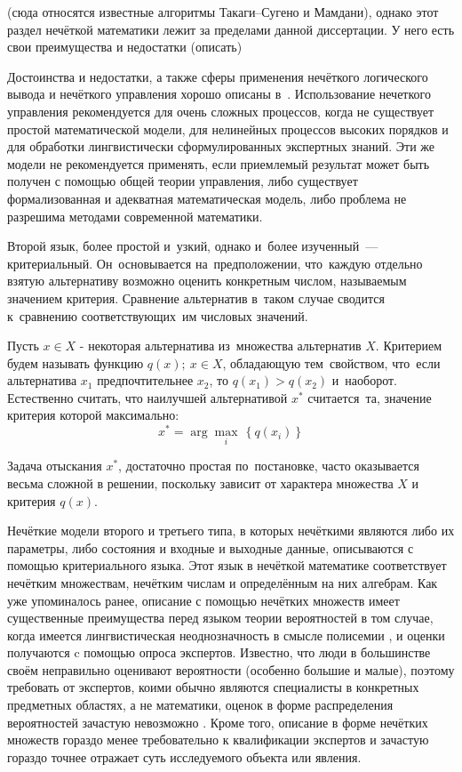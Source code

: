  (сюда относятся известные алгоритмы Такаги--Сугено и Мамдани), однако этот раздел нечёткой математики лежит за пределами данной диссертации. У него есть свои преимущества и недостатки (описать)
 
Достоинства и недостатки, а также сферы применения нечёткого логического вывода и нечёткого управления хорошо описаны в~\cite{Bauer_Winkler}.
Использование нечеткого управления рекомендуется для очень сложных процессов, когда не существует простой математической модели, для нелинейных процессов высоких порядков и для обработки лингвистически сформулированных экспертных знаний. Эти же модели не рекомендуется применять, если приемлемый результат может быть получен с помощью общей теории управления, либо существует формализованная и адекватная математическая модель, либо проблема не разрешима методами современной математики.

Второй язык, более простой и~узкий, однако и~более изученный~--- критериальный. Он~основывается на~предположении, что~каждую отдельно взятую альтернативу возможно оценить конкретным числом, называемым значением критерия. Сравнение альтернатив в~таком случае сводится к~сравнению соответствующих~им числовых значений.

Пусть $x\in X$ - некоторая альтернатива из~множества альтернатив $X$. Критерием будем называть функцию $q\left( x \right);\ x\in X$, обладающую тем~свойством, что~если альтернатива ${x_1}$ предпочтительнее ${x_2}$, то $q\left( x_1 \right)>q\left( x_2 \right)$ и~наоборот. Естественно считать, что наилучшей альтернативой ${{x}^{*}}$ считается~та, значение критерия которой максимально:
\[
	x^{*}=\arg \underset{i}{\mathop{\max }}\,\left\{ q\left( x_i \right) \right\}
\]

Задача отыскания $x^{*}$, достаточно простая по~постановке, часто оказывается весьма сложной в решении, поскольку зависит от характера множества $X$ и критерия $q\left( x \right)$. 

Нечёткие модели второго и третьего типа, в которых нечёткими являются либо их параметры, либо состояния и входные и выходные данные, описываются с помощью критериального языка. Этот язык в нечёткой математике соответствует нечётким множествам, нечётким числам и определённым на них алгебрам. Как уже упоминалось ранее, описание с помощью нечётких множеств имеет существенные преимущества перед языком теории вероятностей в том случае, когда имеется лингвистическая неоднозначность в смысле полисемии \cite{Borisov_Alexeev_Msk}, и оценки получаются c помощью опроса экспертов. Известно, что люди в большинстве своём неправильно оценивают вероятности (особенно большие и малые), поэтому требовать от экспертов, коими обычно являются специалисты в конкретных предметных областях, а не математики, оценок в форме распределения вероятностей зачастую невозможно \cite{Gubko}. Кроме того, описание в форме нечётких множеств гораздо менее требовательно к квалификации экспертов и зачастую гораздо точнее отражает суть исследуемого объекта или явления. 


